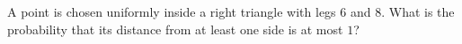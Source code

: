 A point is chosen uniformly inside a right triangle with legs $6$ and $8$. What is the probability that its distance from at least one side is at most $1$?
